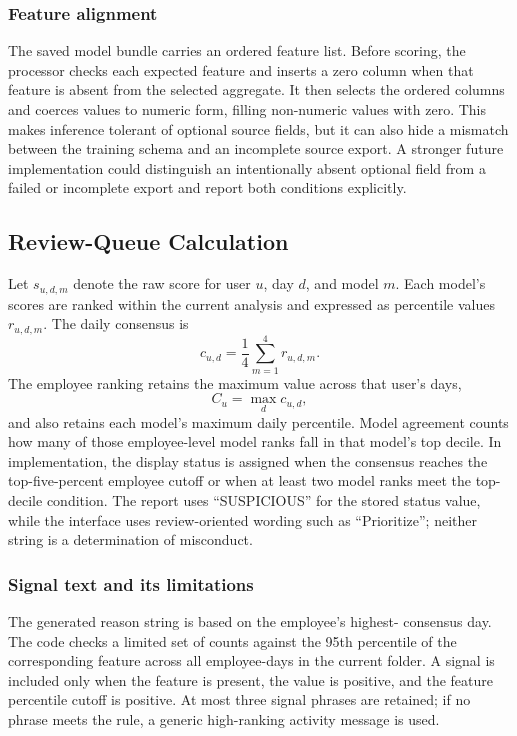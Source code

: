 \subsubsection{Feature alignment}
The saved model bundle carries an ordered feature list. Before scoring,
the processor checks each expected feature and inserts a zero column
when that feature is absent from the selected aggregate. It then selects
the ordered columns and coerces values to numeric form, filling
non-numeric values with zero. This makes inference tolerant of optional
source fields, but it can also hide a mismatch between the training
schema and an incomplete source export. A stronger future implementation
could distinguish an intentionally absent optional field from a failed
or incomplete export and report both conditions explicitly.

\subsection{Review-Queue Calculation}
Let \(s_{u,d,m}\) denote the raw score for user \(u\), day \(d\), and
model \(m\). Each model's scores are ranked within the current analysis
and expressed as percentile values \(r_{u,d,m}\). The daily consensus
is
\[
c_{u,d}=\frac{1}{4}\sum_{m=1}^{4}r_{u,d,m}.
\]
The employee ranking retains the maximum value across that user's days,
\[
C_u=\max_d c_{u,d},
\]
and also retains each model's maximum daily percentile. Model agreement
counts how many of those employee-level model ranks fall in that
model's top decile. In implementation, the display status is assigned
when the consensus reaches the top-five-percent employee cutoff or
when at least two model ranks meet the top-decile condition. The report
uses ``SUSPICIOUS'' for the stored status value, while the interface
uses review-oriented wording such as ``Prioritize''; neither string is
a determination of misconduct.

\subsubsection{Signal text and its limitations}
The generated reason string is based on the employee's highest-
consensus day. The code checks a limited set of counts against the
95th percentile of the corresponding feature across all employee-days
in the current folder. A signal is included only when the feature is
present, the value is positive, and the feature percentile cutoff is
positive. At most three signal phrases are retained; if no phrase meets
the rule, a generic high-ranking activity message is used.

